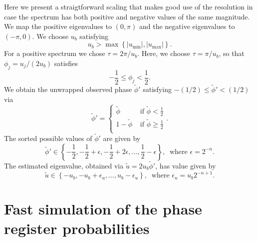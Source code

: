 \documentclass[superscriptaddress,nofootinbib,longbibliography,aps,pre]{revtex4-1}
\newcommand{\umax}{u_{\text{max}}}
\newcommand{\umin}{u_{\text{min}}}
\newcommand{\aphi}{\tilde{\phi}}
\newcommand{\auvec}{\tilde{u}}
\begin{document}
Here we present a straigtforward scaling that makes good use of the resolution
in case the spectrum has both positive and negative values of the same magnitude.
We map the positive eigenvalues to $(0, \pi)$
and the negative eigenvalues to $(-\pi, 0)$.
We choose $u_{b}$ satisfying
%
\begin{equation}
  u_{b} > \max \left\{ |\umin|, |\umax| \right\}.
\end{equation}
%
For a positive spectrum we chose $\tau=2\pi/u_{b}$.
Here, we choose $\tau=\pi/u_{b}$, so that
$\phi_{j}=u_{j}/(2u_{b})$ satisfies
%
\begin{equation}
-\frac{1}{2} \le \phi_{j} < \frac{1}{2}.
\end{equation}
%
We obtain the unwrapped observed phase $\aphi'$
satisfying $-(1/2) \le \aphi' < (1/2)$ via
%
\begin{equation}
  \aphi' =
  \begin{cases}
    \aphi & \text{ if } \aphi < \frac{1}{2} \\
    1 - \aphi & \text{ if } \aphi \ge \frac{1}{2} \\
  \end{cases}.
\end{equation}
%
The sorted possible values of $\aphi'$ are given by
%
\begin{equation}
  \aphi' \in \left\{-\frac{1}{2}, -\frac{1}{2} + \epsilon, -\frac{1}{2} +  2\epsilon, \ldots, \frac{1}{2} - \epsilon \right\},
  \ \text{ where } \epsilon = 2^{-n}.
\end{equation}
%
The estimated eigenvalue, obtained via $\auvec = 2u_{b}\aphi'$, has value given by
%
\begin{equation}
  \auvec \in \left\{-u_{b}, -u_{b} + \epsilon_{u}, \ldots, u_{b} - \epsilon_{u} \right\},
  \ \text{ where } \epsilon_{u} = u_{b}2^{-n+1}.
\end{equation}
%

\section{Fast simulation of the phase register probabilities}
\end{document}
